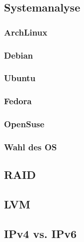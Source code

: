 \subsection{Systemanalyse}
\subsubsection{ArchLinux}

\subsubsection{Debian}

\subsubsection{Ubuntu}

\subsubsection{Fedora}

\subsubsection{OpenSuse}

\subsubsection{Wahl des OS}

\subsection{RAID}

\subsection{LVM}

\subsection{IPv4 vs. IPv6}

